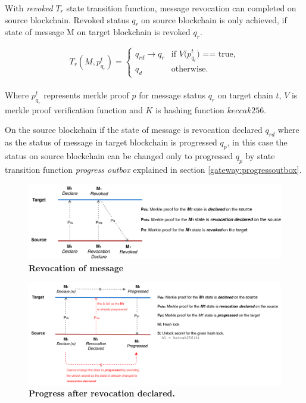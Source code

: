 \documentclass[12pt,a4paper]{article}
\begin{document}
With \emph{revoked} $T_r$ state transition function,  message revocation can completed on source blockchain. Revoked status $q_r$ on source blockchain is only achieved, if state of message M on target blockchain is revoked $q_r$.

\begin{equation*}
T_{r}(M,p^t_{q_r})=\begin{cases}
q_{rd} \rightarrow q_r & \text{if $V$($p^t_{q_r}$) == true},\\
q_d& \text{otherwise}.
\end{cases}
\end{equation*}
\begin{align*}
\end{align*}

Where $p^t_{q_r}$ represents merkle proof $p$ for message status $q_r$ on target chain $t$, $V$ is merkle proof verification function and $K$ is hashing function $keccak256$.

 
On the source blockchain if the state of message is revocation declared $q_{rd}$ where as the status of message in target blockchain is progressed ${q_p}$, in this case the status on source blockchain can be changed only to progressed ${q_p}$ by state transition function \emph{progress outbox} explained in section \ref{gateway:progressoutbox}.

\begin{figure}[htb]
    \centering
	\includegraphics[width=\textwidth]{revocation}
	\caption{\textbf{ Revocation of message}}
	\label{fig:revocation}
\end{figure}


\begin{figure}[htb]
    \centering
	\includegraphics[width=\textwidth]{revocation_progress}
	\caption{\textbf{ Progress after revocation declared.}}
	\label{fig:revocation}
\end{figure}
\end{document}
